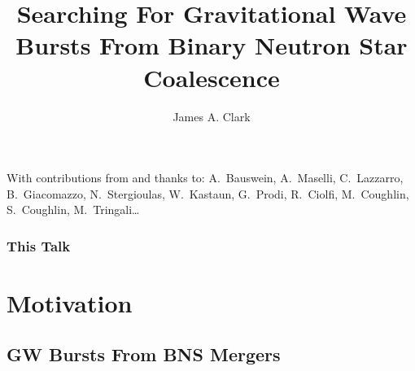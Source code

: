 \documentclass[serif,mathserif,10pt]{beamer}
\let\oldframetitle\frametitle%
\renewcommand{\frametitle}[1]{%
      \oldframetitle{#1}\setstretch{1.2}}
\begin{document}

\title[BNS Bursts]{Searching For Gravitational Wave Bursts From
Binary Neutron Star Coalescence}
\author{James A. Clark}
\date{} 


\begin{frame}[plain]
\titlepage
\small{With contributions from and thanks to: A.~Bauswein, A.~Maselli,
C.~Lazzarro, B.~Giacomazzo, N.~Stergioulas, W.~Kastaun, G.~Prodi, R.~Ciolfi,
M.~Coughlin, S.~Coughlin, M.~Tringali\dots}
\end{frame}

\begin{frame}
    \frametitle{This Talk}
    \centering
    \tableofcontents
\end{frame} 

\section{Motivation}

\subsection{GW Bursts From BNS Mergers}
\end{document}
